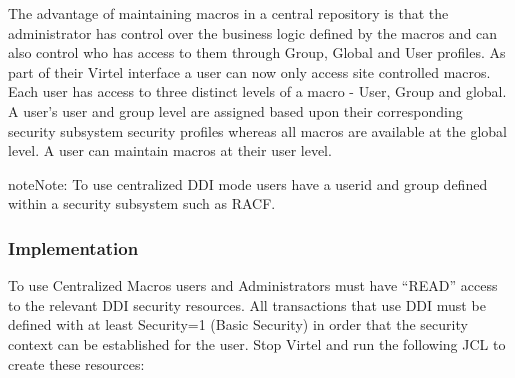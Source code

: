 \documentclass[letterpaper,10pt,english]{sphinxmanual}
\begin{document}
The advantage of maintaining macros in a central repository is that the administrator has control over the business logic defined by the macros and can also control who has access to them through Group, Global and User profiles. As part of their Virtel interface a user can now only access site controlled macros. Each user has access to three distinct levels of a macro - User, Group and global. A user’s user and group level are assigned based upon their corresponding security subsystem security profiles whereas all macros are available at the global level. A user can maintain macros at their user level.

\begin{sphinxadmonition}{note}{Note:}
To use centralized DDI mode users have a userid and group defined within a security subsystem such as RACF.
\end{sphinxadmonition}

\ignorespaces 

\subsubsection{Implementation}
\label{\detokenize{Customization:implementation}}\label{\detokenize{Customization:index-80}}
To use Centralized Macros users and Administrators must have “READ” access to the relevant DDI security resources. All transactions that use DDI must be defined with at least Security=1 (Basic Security) in order that the security context can be established for the user.  Stop Virtel and run the following JCL to create these resources:
\end{document}
